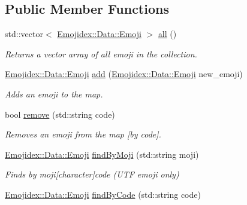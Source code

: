 \subsection*{Public Member Functions}
\begin{DoxyCompactItemize}
\item 
std\+::vector$<$ \hyperlink{classEmojidex_1_1Data_1_1Emoji}{Emojidex\+::\+Data\+::\+Emoji} $>$ \hyperlink{classEmojidex_1_1Data_1_1Collection_a650a418293d89311263dc3e744416b1f}{all} ()\hypertarget{classEmojidex_1_1Data_1_1Collection_a650a418293d89311263dc3e744416b1f}{}\label{classEmojidex_1_1Data_1_1Collection_a650a418293d89311263dc3e744416b1f}

\begin{DoxyCompactList}\small\item\em Returns a vector array of all emoji in the collection. \end{DoxyCompactList}\item 
\hyperlink{classEmojidex_1_1Data_1_1Emoji}{Emojidex\+::\+Data\+::\+Emoji} \hyperlink{classEmojidex_1_1Data_1_1Collection_ab06d56b5d177f1e489d36c5ccf02b362}{add} (\hyperlink{classEmojidex_1_1Data_1_1Emoji}{Emojidex\+::\+Data\+::\+Emoji} new\+\_\+emoji)\hypertarget{classEmojidex_1_1Data_1_1Collection_ab06d56b5d177f1e489d36c5ccf02b362}{}\label{classEmojidex_1_1Data_1_1Collection_ab06d56b5d177f1e489d36c5ccf02b362}

\begin{DoxyCompactList}\small\item\em Adds an emoji to the map. \end{DoxyCompactList}\item 
bool \hyperlink{classEmojidex_1_1Data_1_1Collection_a1e149fc6e461293a80babfd7461b02f4}{remove} (std\+::string code)
\begin{DoxyCompactList}\small\item\em Removes an emoji from the map \mbox{[}by code\mbox{]}. \end{DoxyCompactList}\item 
\hyperlink{classEmojidex_1_1Data_1_1Emoji}{Emojidex\+::\+Data\+::\+Emoji} \hyperlink{classEmojidex_1_1Data_1_1Collection_a85b15d61175aee9cce9b42fe6c21cf80}{find\+By\+Moji} (std\+::string moji)\hypertarget{classEmojidex_1_1Data_1_1Collection_a85b15d61175aee9cce9b42fe6c21cf80}{}\label{classEmojidex_1_1Data_1_1Collection_a85b15d61175aee9cce9b42fe6c21cf80}

\begin{DoxyCompactList}\small\item\em Finds by moji\mbox{[}character\mbox{]}code (U\+TF emoji only) \end{DoxyCompactList}\item 
\hyperlink{classEmojidex_1_1Data_1_1Emoji}{Emojidex\+::\+Data\+::\+Emoji} \hyperlink{classEmojidex_1_1Data_1_1Collection_a5ba6be5a862e6e23b2a5c99e6d751615}{find\+By\+Code} (std\+::string code)\hypertarget{classEmojidex_1_1Data_1_1Collection_a5ba6be5a862e6e23b2a5c99e6d751615}{}\label{classEmojidex_1_1Data_1_1Collection_a5ba6be5a862e6e23b2a5c99e6d751615}


\end{DoxyCompactItemize}
